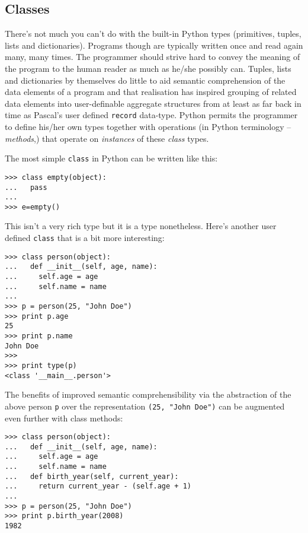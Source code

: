 \subsection{Classes}

There's not much you can't do with the built-in Python types
(primitives, tuples, lists and dictionaries). Programs though are
typically written once and read again many, many times. The programmer
should strive hard to convey the meaning of the program to the human
reader as much as he/she possibly can. Tuples, lists and dictionaries by
themselves do little to aid semantic comprehension of the data
elements of a program and that realisation has inspired grouping of
related data elements into user-definable aggregate structures from
at least as far back in time as Pascal's user defined \verb|record|
data-type. Python permits the programmer to define his/her own types
together with operations (in Python terminology -- \emph{methods},)
that operate on \emph{instances} of these \emph{class} types.

The most simple \verb|class| in Python can be written like this:
\begin{verbatim}
>>> class empty(object):
...   pass
... 
>>> e=empty()
\end{verbatim}
This isn't a very rich type but it is a type nonetheless. Here's
another user defined \verb|class| that is a bit more interesting:
\begin{verbatim}
>>> class person(object):
...   def __init__(self, age, name):
...     self.age = age
...     self.name = name
...
>>> p = person(25, "John Doe")
>>> print p.age
25
>>> print p.name
John Doe
>>> 
>>> print type(p)
<class '__main__.person'>
\end{verbatim}
The benefits of improved semantic comprehensibility via the
abstraction of the above person \verb|p| over the representation
\verb|(25, "John Doe")| can be augmented even further with class
methods:
\begin{verbatim}
>>> class person(object):
...   def __init__(self, age, name):
...     self.age = age
...     self.name = name
...   def birth_year(self, current_year):
...     return current_year - (self.age + 1)
... 
>>> p = person(25, "John Doe")
>>> print p.birth_year(2008)
1982
\end{verbatim}

